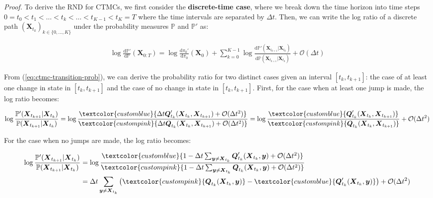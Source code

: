 \documentclass{article}
\newcommand{\bluetext}[1]{\textcolor{customblue}{#1}}
\newcommand{\pinktext}[1]{\textcolor{custompink}{#1}}
\begin{document}
\textit{Proof.} To derive the RND for CTMCs, we first consider the \textbf{discrete-time case}, where we break down the time horizon into time steps $0=t_0< t_1< \dots< t_k< \dots< t_{K-1}< t_K=T$ where the time intervals are separated by $\Delta t$. Then, we can write the log ratio of a discrete path $(\boldsymbol{X}_{t_k})_{k\in \{0, \dots, K\}}$ under the probability measures $\mathbb{P}$ and $\mathbb{P}'$ as:
\begin{small}
\begin{align}
    \log \frac{\mathrm{d}\mathbb{P}'}{\mathrm{d}\mathbb{P}}(\boldsymbol{X}_{0:T})=\log \frac{\mathrm{d}\pi_0'}{\mathrm{d}\pi_0}(\boldsymbol{X}_0)+\sum_{k=0}^{K-1}\log \frac{\mathrm{d}\mathbb{P}'(\boldsymbol{X}_{t_{k+1}}|\boldsymbol{X}_{t_k})}{\mathrm{d}\mathbb{P}(\boldsymbol{X}_{t_{k+1}}|\boldsymbol{X}_{t_k})}+\mathcal{O}(\Delta t)\label{eq:ctmc-rnd-eq1}
\end{align}
\end{small}
From (\ref{eq:ctmc-transition-prob}), we can derive the probability ratio for two distinct cases given an interval $[t_k, t_{k+1}]$: the case of at least one change in state in $[t_k, t_{k+1}]$ and the case of no change in state in $[t_k, t_{k+1}]$. First, for the case when at least one jump is made, the log ratio becomes:
\begin{small}
\begin{align}
    \log \frac{\mathbb{P}'(\boldsymbol{X}_{t_{k+1}}|\boldsymbol{X}_{t_k})}{\mathbb{P}(\boldsymbol{X}_{t_{k+1}}|\boldsymbol{X}_{t_k})}=\log \frac{\bluetext{\Delta t\boldsymbol{Q}'_{t_k}(\boldsymbol{X}_{t_k}, \boldsymbol{X}_{t_{k+1}}) +\mathcal{O}(\Delta t^2)}}{\pinktext{\Delta t\boldsymbol{Q}_{t_k}(\boldsymbol{X}_{t_k}, \boldsymbol{X}_{t_{k+1}}) +\mathcal{O}(\Delta t^2)}}=\log \frac{\bluetext{\boldsymbol{Q}'_{t_k}(\boldsymbol{X}_{t_k}, \boldsymbol{X}_{t_{k+1}})}}{\pinktext{\boldsymbol{Q}_{t_k}(\boldsymbol{X}_{t_k}, \boldsymbol{X}_{t_{k+1}})}}+\mathcal{O}(\Delta t^2)\label{eq:ctmc-rnd-case1}
\end{align}
\end{small}
For the case when no jumps are made, the log ratio becomes:
\begin{small}
\begin{align}
    \log \frac{\mathbb{P}'(\boldsymbol{X}_{t_{k+1}}|\boldsymbol{X}_{t_k})}{\mathbb{P}(\boldsymbol{X}_{t_{k+1}}|\boldsymbol{X}_{t_k})}&=\log \frac{\bluetext{1-\Delta t\sum_{\boldsymbol{y}\neq\boldsymbol{X}_{t_k}}\boldsymbol{Q}'_{t_k}(\boldsymbol{X}_{t_k},\boldsymbol{y})+\mathcal{O}(\Delta t^2)}}{\pinktext{1-\Delta t\sum_{\boldsymbol{y}\neq\boldsymbol{X}_{t_k}}\boldsymbol{Q}_{t_k}(\boldsymbol{X}_{t_k},\boldsymbol{y})+\mathcal{O}(\Delta t^2)}}\nonumber\\
    &=\Delta t\sum_{\boldsymbol{y}\neq \boldsymbol{X}_{t_k}}\left(\pinktext{\boldsymbol{Q}_{t_k}(\boldsymbol{X}_{t_k}, \boldsymbol{y})}-\bluetext{\boldsymbol{Q}'_{t_k}(\boldsymbol{X}_{t_k}, \boldsymbol{y})}\right)+\mathcal{O}(\Delta t^2)\label{eq:ctmc-rnd-case2}
\end{align}
\end{small}
\end{document}
